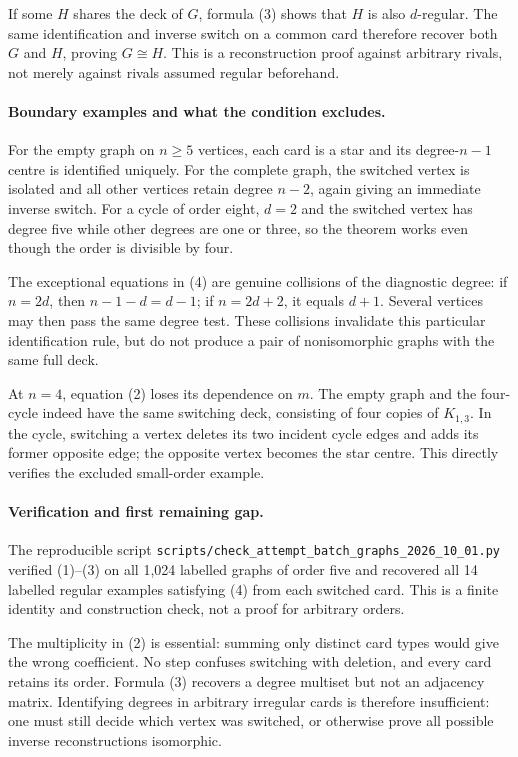 \documentclass[11pt,a4paper]{article}
\begin{document}
If some $H$ shares the deck of $G$, formula (3) shows that $H$ is also $d$-regular. The same identification and inverse switch on a common card therefore recover both $G$ and $H$, proving $G\cong H$. This is a reconstruction proof against arbitrary rivals, not merely against rivals assumed regular beforehand.

\paragraph{Boundary examples and what the condition excludes.}
For the empty graph on $n\ge5$ vertices, each card is a star and its degree-$n-1$ centre is identified uniquely. For the complete graph, the switched vertex is isolated and all other vertices retain degree $n-2$, again giving an immediate inverse switch. For a cycle of order eight, $d=2$ and the switched vertex has degree five while other degrees are one or three, so the theorem works even though the order is divisible by four.

The exceptional equations in (4) are genuine collisions of the diagnostic degree: if $n=2d$, then $n-1-d=d-1$; if $n=2d+2$, it equals $d+1$. Several vertices may then pass the same degree test. These collisions invalidate this particular identification rule, but do not produce a pair of nonisomorphic graphs with the same full deck.

At $n=4$, equation (2) loses its dependence on $m$. The empty graph and the four-cycle indeed have the same switching deck, consisting of four copies of $K_{1,3}$. In the cycle, switching a vertex deletes its two incident cycle edges and adds its former opposite edge; the opposite vertex becomes the star centre. This directly verifies the excluded small-order example.

\paragraph{Verification and first remaining gap.}
The reproducible script \texttt{scripts/check\_attempt\_batch\_graphs\_2026\_10\_01.py} verified (1)--(3) on all 1,024 labelled graphs of order five and recovered all 14 labelled regular examples satisfying (4) from each switched card. This is a finite identity and construction check, not a proof for arbitrary orders.

The multiplicity in (2) is essential: summing only distinct card types would give the wrong coefficient. No step confuses switching with deletion, and every card retains its order. Formula (3) recovers a degree multiset but not an adjacency matrix. Identifying degrees in arbitrary irregular cards is therefore insufficient: one must still decide which vertex was switched, or otherwise prove all possible inverse reconstructions isomorphic.
\end{document}
